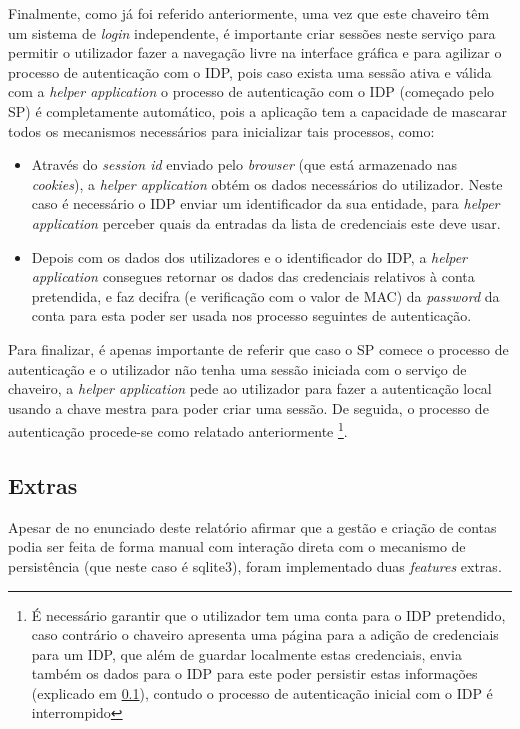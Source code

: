 \quad Finalmente, como já foi referido anteriormente, uma vez que este chaveiro têm um sistema de \textit{login} independente, é importante criar sessões neste serviço para permitir o utilizador fazer a navegação livre na interface gráfica e para agilizar o processo de autenticação com o IDP, pois caso exista uma sessão ativa e válida com a \textit{helper application} o processo de autenticação com o IDP (começado pelo SP) é completamente automático, pois a aplicação tem a capacidade de mascarar todos os mecanismos necessários para inicializar tais processos, como:
\begin{itemize}
    \item Através do \textit{session id} enviado pelo \textit{browser} (que está armazenado nas \textit{cookies}), a \textit{helper application} obtém os dados necessários do utilizador. Neste caso é necessário o IDP enviar um identificador da sua entidade, para \textit{helper application} perceber quais da entradas da lista de credenciais este deve usar.
    \item Depois com os dados dos utilizadores e o identificador do IDP, a \textit{helper application} consegues retornar os dados das credenciais relativos à conta pretendida, e faz decifra (e verificação com o valor de MAC) da \textit{password} da conta para esta poder ser usada nos processo seguintes de autenticação.
\end{itemize}

\quad Para finalizar, é apenas importante de referir que caso o SP comece o processo de autenticação e o utilizador não tenha uma sessão iniciada com o serviço de chaveiro, a \textit{helper application} pede ao utilizador para fazer a autenticação local usando a chave mestra para poder criar uma sessão. De seguida, o processo de autenticação procede-se como relatado anteriormente \footnote{É necessário garantir que o utilizador tem uma conta para o IDP pretendido, caso contrário o chaveiro apresenta uma página para a adição de credenciais para um IDP, que além de guardar localmente estas credenciais, envia também os dados para o IDP para este poder persistir estas informações (explicado em \ref{chaveiro_extras}), contudo o processo de autenticação inicial com o IDP é interrompido}.

\subsection{Extras}
\label{chaveiro_extras}

\quad Apesar de no enunciado deste relatório afirmar que a gestão e criação de contas podia ser feita de forma manual com interação direta com o mecanismo de persistência (que neste caso é sqlite3), foram implementado duas \textit{features} extras.

